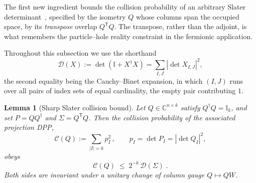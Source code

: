 \documentclass[prx,twocolumn,superscriptaddress,aps,10pt, frontmatterverbose, reprint,footinbib,longbibliography=true]{revtex4-2}
\newtheorem{lemma}{Lemma}
\newcommand{\trans}{\mathsf{T}}
\begin{document}
The first new ingredient bounds the collision probability of an arbitrary Slater determinant~\cite{Mbeng2024,surace}, specified by the isometry $Q$ whose columns span the occupied space, by its \emph{transpose} overlap $Q^{\trans}Q$. The transpose, rather than the adjoint, is what remembers the particle--hole reality constraint in the fermionic application.

Throughout this subsection we use the shorthand
\begin{equation}
    \mathcal{D}(X):=\det\!\left(\mathbb{I}+X^\dagger X\right)
    =\sum_{I,J}\left|\det X_{I,J}\right|^2 ,
    \label{eq:Dfunctional}
\end{equation}
the second equality being the Cauchy--Binet expansion, in which $(I,J)$ runs over all pairs of index sets of equal cardinality, the empty pair contributing $1$.

\begin{lemma}[Sharp Slater collision bound]
\label{lem:Slater-bound}
Let $Q\in\mathbb{C}^{n\times k}$ satisfy $Q^\dagger Q=\mathbb{I}_k$, and set $P=QQ^\dagger$ and $\Sigma=Q^{\trans}Q$. Then the collision probability of the associated projection DPP,
\begin{equation}
    \mathcal{C}(Q):=\sum_{|I|=k}p_I^2\,,
    \qquad p_I=\det P_I=\left|\det Q_I\right|^2 ,
\end{equation}
obeys
\begin{equation}
    \mathcal{C}(Q)\;\le\;2^{-k}\,\mathcal{D}(\Sigma)\;.
    \label{eq:Slater-bound}
\end{equation}
Both sides are invariant under a unitary change of column gauge $Q\mapsto QW$.
\end{lemma}
\end{document}
